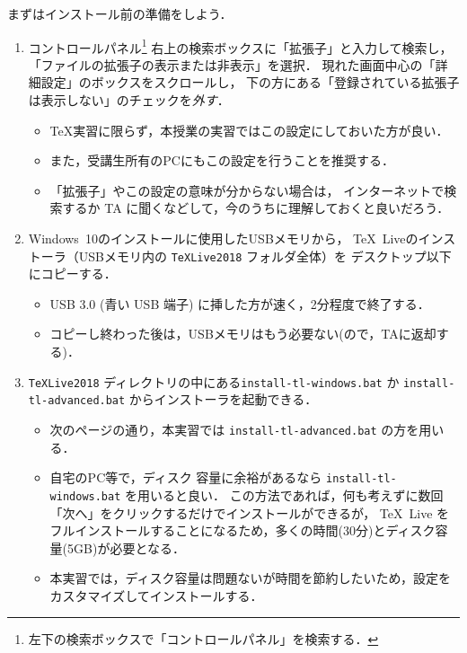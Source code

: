 \documentclass{ltjsarticle}
\begin{document}
まずはインストール前の準備をしよう．

\begin{enumerate}
  \itemsep\medskipamount
  \setcounter{enumi}{-1}
\item コントロールパネル\footnote{左下の検索ボックスで「コントロールパネル」を検索する．}
  右上の検索ボックスに「拡張子」と入力して検索し，
  「ファイルの拡張子の表示または非表示」を選択．
  現れた画面中心の「詳細設定」のボックスをスクロールし，
  下の方にある「登録されている拡張子は表示しない」のチェックを\emph{外す}．
  \begin{itemize}
  \item \TeX 実習に限らず，本授業の実習ではこの設定にしておいた方が良い．
  \item また，受講生所有のPCにもこの設定を行うことを推奨する．
  \item 「拡張子」やこの設定の意味が分からない場合は，
    インターネットで検索するか TA に聞くなどして，今のうちに理解しておくと良いだろう．
  \end{itemize}
\item Windows~10のインストールに使用したUSBメモリから，
  \TeX~Liveのインストーラ（USBメモリ内の \texttt{TeXLive2018} フォルダ全体）を
  デスクトップ以下にコピーする．
  \begin{itemize}
  \item USB 3.0 (青い USB 端子) に挿した方が速く，2分程度で終了する．
  \item コピーし終わった後は，USBメモリはもう必要ない(ので，TAに返却する)．
  \end{itemize}
\item \texttt{TeXLive2018} ディレクトリの中にある\texttt{install-tl-windows.bat}
  か \texttt{install-tl-advanced.bat} からインストーラを起動できる．
  \begin{itemize}
  \item 次のページの通り，本実習では \texttt{install-tl-advanced.bat} の方を用いる．
  \item 自宅のPC等で，ディスク
    容量に余裕があるなら \texttt{install-tl-windows.bat} を用いると良い．
    この方法であれば，何も考えずに数回「次へ」をクリックするだけでインストールができるが，
    \TeX~Live をフルインストールすることになるため，多くの時間(30分)とディスク容量(5GB)が必要となる．
  \item 本実習では，ディスク容量は問題ないが時間を節約したいため，設定をカスタマイズしてインストールする．
  \end{itemize}
\end{enumerate}
\end{document}
